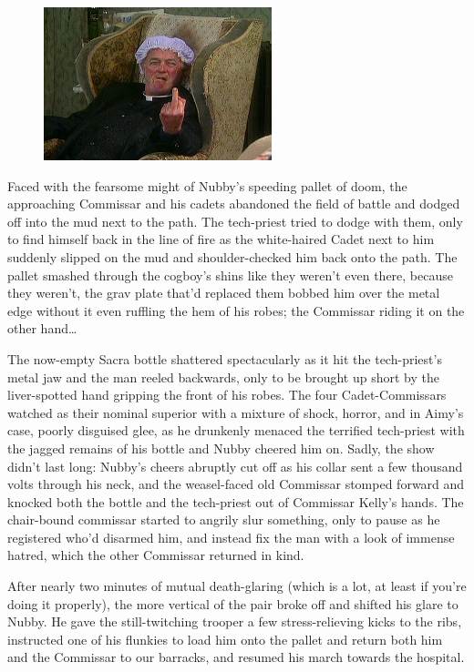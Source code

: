 \begin{figure}
	\begin{center}
		\includegraphics[width=\figwidth]{pics/21/28.png}
	\end{center}
\end{figure}
Faced with the fearsome might of Nubby's speeding pallet of doom, the approaching Commissar and his cadets abandoned the field of battle and dodged off into the mud next to the path. 
The tech-priest tried to dodge with them, only to find himself back in the line of fire as the white-haired Cadet next to him suddenly slipped on the mud and shoulder-checked him back onto the path. 
The pallet smashed through the cogboy's shins like they weren't even there, because they weren't, the grav plate that'd replaced them bobbed him over the metal edge without it even ruffling the hem of his robes; 
the Commissar riding it on the other hand… 

The now-empty Sacra bottle shattered spectacularly as it hit the tech-priest's metal jaw and the man reeled backwards, only to be brought up short by the liver-spotted hand gripping the front of his robes. 
The four Cadet-Commissars watched as their nominal superior with a mixture of shock, horror, and in Aimy's case, poorly disguised glee, as he drunkenly menaced the terrified tech-priest with the jagged remains of his bottle and Nubby cheered him on. 
Sadly, the show didn't last long: 
Nubby's cheers abruptly cut off as his collar sent a few thousand volts through his neck, and the weasel-faced old Commissar stomped forward and knocked both the bottle and the tech-priest out of Commissar Kelly's hands. 
The chair-bound commissar started to angrily slur something, only to pause as he registered who'd disarmed him, and instead fix the man with a look of immense hatred, which the other Commissar returned in kind. 


After nearly two minutes of mutual death-glaring (which is a lot, at least if you're doing it properly), the more vertical of the pair broke off and shifted his glare to Nubby. 
He gave the still-twitching trooper a few stress-relieving kicks to the ribs, instructed one of his flunkies to load him onto the pallet and return both him and the Commissar to our barracks, and resumed his march towards the hospital.

